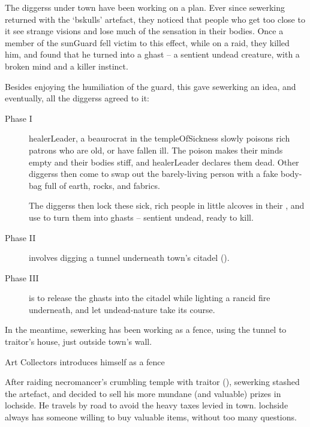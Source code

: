 \label{sewerking}

\begin{exampletext}
  \noindent
  The \glspl{diggers} under \gls{town} have been working on a plan.
  Ever since \gls{sewerking} returned with the `\gls{bskulls}' \gls{artefact}, they noticed that people who get too close to it see strange visions and lose much of the sensation in their bodies.
  Once a member of the \gls{sunGuard} fell victim to this effect, while on a raid, they killed him, and found that he turned into a ghast -- a sentient undead creature, with a broken mind and a killer instinct.%

  Besides enjoying the humiliation of the guard, this gave \gls{sewerking} an idea, and eventually, all the \glspl{diggers} agreed to it:

\end{exampletext}

\label{ghastPlan}
\begin{description}
  \item[Phase I]
  \Gls{healerLeader}, a beaurocrat in the \gls{templeOfSickness} slowly poisons rich patrons who are old, or have fallen ill.
  The poison makes their minds empty and their bodies stiff, and \gls{healerLeader} declares them dead.
  Other \glspl{diggers} then come to swap out the barely-living person with a fake body-bag full of earth, rocks, and fabrics.

  The \glspl{diggers} then lock these sick, rich people in little alcoves in their , and use  to turn them into ghasts -- sentient undead, ready to kill.
  \item[Phase II]
  involves digging a tunnel underneath \gls{town}'s citadel ().
  \item[Phase III]
  is to release the ghasts into the citadel while lighting a rancid fire underneath, and let undead-nature take its course.
\end{description}
\null

In the meantime, \gls{sewerking} has been working as a fence, using the tunnel to \gls{traitor}'s house, just outside \gls{town}'s wall.

{Art Collectors}%
{ introduces himself as a fence}%

\begin{exampletext}
  After raiding \gls{necromancer}'s crumbling temple with \gls{traitor} (), \gls{sewerking} stashed the \gls{artefact}, and decided to sell his more mundane (and valuable) prizes in \gls{lochside}.
  He travels by road to avoid the heavy taxes levied in \gls{town}.
  \Gls{lochside} always has someone willing to buy valuable items, without too many questions.
\end{exampletext}

